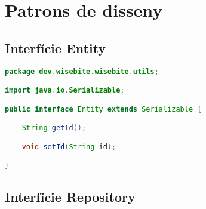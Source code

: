 
\chapter{Patrons de disseny} %

\label{AppendixA} %

\section{Interfície Entity}
\label{Entity}

\begin{lstlisting}[language=java,firstnumber=1]
package dev.wisebite.wisebite.utils;

import java.io.Serializable;

public interface Entity extends Serializable {

    String getId();

    void setId(String id);

}
\end{lstlisting}

\clearpage
\section{Interfície Repository}
\label{Repository}

